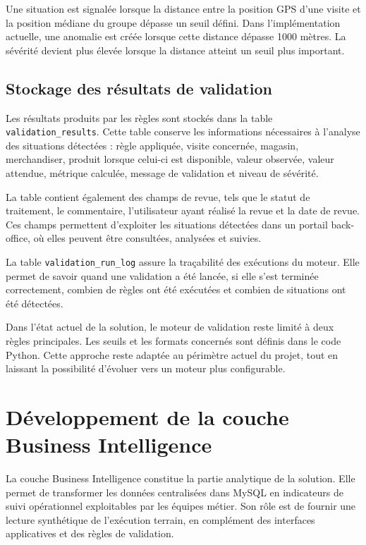 Une situation est signalée lorsque la distance entre la position GPS d’une visite et la position médiane du groupe dépasse un seuil défini. Dans l’implémentation actuelle, une anomalie est créée lorsque cette distance dépasse 1000 mètres. La sévérité devient plus élevée lorsque la distance atteint un seuil plus important.

\subsection{Stockage des résultats de validation}

Les résultats produits par les règles sont stockés dans la table \texttt{validation\_results}. Cette table conserve les informations nécessaires à l’analyse des situations détectées : règle appliquée, visite concernée, magasin, merchandiser, produit lorsque celui-ci est disponible, valeur observée, valeur attendue, métrique calculée, message de validation et niveau de sévérité.

La table contient également des champs de revue, tels que le statut de traitement, le commentaire, l’utilisateur ayant réalisé la revue et la date de revue. Ces champs permettent d’exploiter les situations détectées dans un portail back-office, où elles peuvent être consultées, analysées et suivies.

La table \texttt{validation\_run\_log} assure la traçabilité des exécutions du moteur. Elle permet de savoir quand une validation a été lancée, si elle s’est terminée correctement, combien de règles ont été exécutées et combien de situations ont été détectées.

Dans l’état actuel de la solution, le moteur de validation reste limité à deux règles principales. Les seuils et les formats concernés sont définis dans le code Python. Cette approche reste adaptée au périmètre actuel du projet, tout en laissant la possibilité d’évoluer vers un moteur plus configurable.

\section{Développement de la couche Business Intelligence}

La couche Business Intelligence constitue la partie analytique de la solution. Elle permet de transformer les données centralisées dans MySQL en indicateurs de suivi opérationnel exploitables par les équipes métier. Son rôle est de fournir une lecture synthétique de l’exécution terrain, en complément des interfaces applicatives et des règles de validation.


